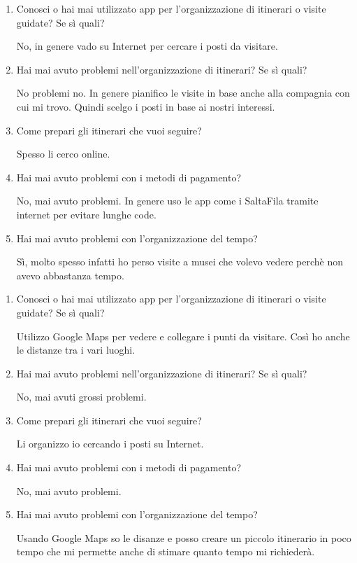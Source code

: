 \clearpage
{}

\begin{enumerate}

\item Conosci o hai mai utilizzato app per l'organizzazione di itinerari o visite guidate? Se sì quali?

No, in genere vado su Internet per cercare i posti da visitare.

\item Hai mai avuto problemi nell'organizzazione di itinerari? Se sì quali?

No problemi no. In genere pianifico le visite in base anche alla compagnia con cui mi trovo. Quindi scelgo i posti in base ai nostri interessi.

\item Come prepari gli itinerari che vuoi seguire?

Spesso li cerco online.

\item Hai mai avuto problemi con i metodi di pagamento?

No, mai avuto problemi. In genere uso le app come i SaltaFila tramite internet per evitare lunghe code.

\item Hai mai avuto problemi con l'organizzazione del tempo?

Sì, molto spesso infatti ho perso visite a musei che volevo vedere perchè non avevo abbastanza tempo.

\end{enumerate}

\clearpage
{}

\begin{enumerate}

\item Conosci o hai mai utilizzato app per l'organizzazione di itinerari o visite guidate? Se sì quali?

Utilizzo Google Maps per vedere e collegare i punti da visitare. Così ho anche le distanze tra i vari luoghi.

\item Hai mai avuto problemi nell'organizzazione di itinerari? Se sì quali?

No, mai avuti grossi problemi.

\item Come prepari gli itinerari che vuoi seguire?

Li organizzo io cercando i posti su Internet.

\item Hai mai avuto problemi con i metodi di pagamento?

No, mai avuto problemi.

\item Hai mai avuto problemi con l'organizzazione del tempo?

Usando Google Maps so le disanze e posso creare un piccolo itinerario in poco tempo che mi permette anche di stimare quanto tempo mi richiederà.

\end{enumerate}

